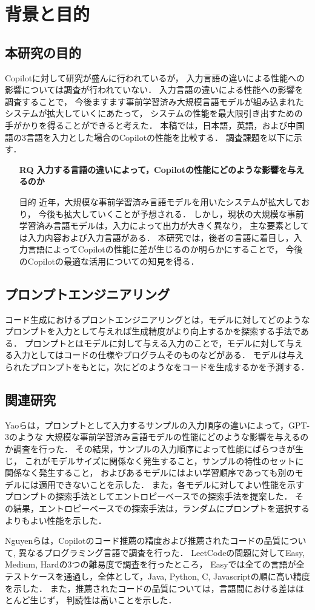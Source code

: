 \section{背景と目的\label{related_research}}

\subsection{本研究の目的}
  Copilotに対して研究が盛んに行われているが，
  入力言語の違いによる性能への影響については調査が行われていない．
  入力言語の違いによる性能への影響を調査することで，
  今後ますます事前学習済み大規模言語モデルが組み込まれたシステムが拡大していくにあたって，
  システムの性能を最大限引き出すための手がかりを得ることができると考えた．
  本稿では，日本語，英語，および中国語の3言語を入力とした場合のCopilotの性能を比較する．
  調査課題を以下に示す．

  
  \begin{itemize}
    \item[\textbf{RQ}] \textbf{入力する言語の違いによって，Copilotの性能にどのような影響を与えるのか}
      \item[目的]{近年，大規模な事前学習済み言語モデルを用いたシステムが拡大しており，
      今後も拡大していくことが予想される．
      しかし，現状の大規模な事前学習済み言語モデルは，入力によって出力が大きく異なり，
      主な要素としては入力内容および入力言語がある．
      本研究では，後者の言語に着目し，入力言語によってCopilotの性能に差が生じるのか明らかにすることで，
      今後のCopilotの最適な活用についての知見を得る．}
  \end{itemize}

\subsection{プロンプトエンジニアリング}
  コード生成におけるプロントエンジニアリングとは，モデルに対してどのようなプロンプトを入力として与えれば生成精度がより向上するかを探索する手法である．
  プロンプトとはモデルに対して与える入力のことで，モデルに対して与える入力としてはコードの仕様やプログラムそのものなどがある．
  モデルは与えられたプロンプトをもとに，次にどのようなをコードを生成するかを予測する．

\subsection{関連研究}
  Yaoらは，プロンプトとして入力するサンプルの入力順序の違いによって，GPT-3のような
  大規模な事前学習済み言語モデルの性能にどのような影響を与えるのか調査を行った\cite{Yao2022ACL}．
  その結果，サンプルの入力順序によって性能にばらつきが生じ，
  これがモデルサイズに関係なく発生すること，サンプルの特性のセットに関係なく発生すること，
  およびあるモデルにはよい学習順序であっても別のモデルには適用できないことを示した．
  また，各モデルに対してよい性能を示すプロンプトの探索手法としてエントロピーベースでの探索手法を提案した．
  その結果，エントロピーベースでの探索手法は，ランダムにプロンプトを選択するよりもよい性能を示した．

  Nguyenらは，Copilotのコード推薦の精度および推薦されたコードの品質について,
  異なるプログラミング言語で調査を行った\cite{Nguyen2022MSR}．
  LeetCodeの問題に対してEasy, Medium, Hardの3つの難易度で調査を行ったところ，
  Easyでは全ての言語が全テストケースを通過し，全体として，Java, Python, C, Javascriptの順に高い精度を示した．
  また，推薦されたコードの品質については，言語間における差はほとんど生じず，
  判読性は高いことを示した．


  